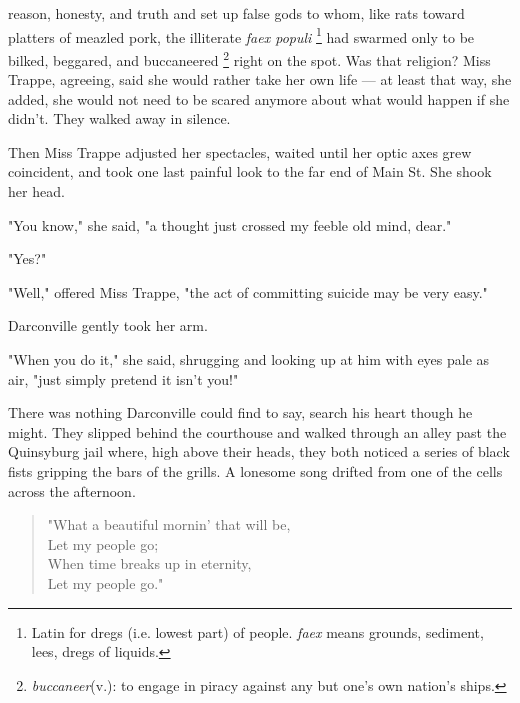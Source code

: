 reason, honesty, and truth and set up false gods to whom, like rats toward platters 
of meazled 
pork, the illiterate \textit{faex populi}
\footnote{ Latin for dregs (i.e. lowest part) of people. \textit{faex} means
  grounds, sediment, lees, dregs of liquids.}
had swarmed only to be bilked, 
beggared, and buccaneered 
\footnote{ \textdbend \textit{buccaneer}(v.): to engage in piracy against 
  any but one's own nation's ships.}
right on the spot. Was that religion? Miss Trappe, agreeing, said
she would rather take her own life --- at least that way, she added, she would 
not need to be scared anymore about what would happen if she didn't. They walked
away in silence.

  Then Miss Trappe adjusted her spectacles, waited until her optic axes grew
coincident, and took one last painful look to the far end of Main St. She shook
her head.

  "You know," she said, "a thought just crossed my feeble 
old mind, dear."

  "Yes?"

  "Well," offered Miss Trappe, "the act of committing suicide may be very easy."

  Darconville gently took her arm.

  "When you do it," she said, shrugging and looking up at him with eyes pale as
air, "just simply pretend it isn't you!"

  There was nothing Darconville could find to say, search his heart though he
might. They slipped behind the courthouse and walked through an alley past the
Quinsyburg jail where, high above their heads, they both noticed a series of
black fists gripping the bars of the grills. A lonesome song drifted from one of
the cells across the afternoon.
 
\begin{verse}
      "What a beautiful mornin' that will be,  \\
      \hspace{2em}    Let my people go;  \\
      When time breaks up in eternity,  \\
      \hspace{2em}    Let my people go."
\end{verse}
 
